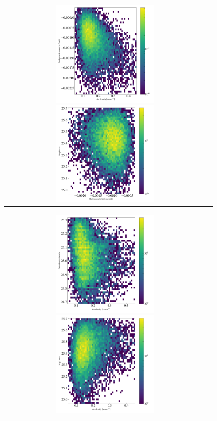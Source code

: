 \documentclass[fleqn,usenatbib,useAMS]{mnras}
\begin{document}
\begin{figure}
\begin{tabular}{cc}
\includegraphics[width=0.5\textwidth]{figures_tmp/sys/correlation1.png}
\includegraphics[width=0.5\textwidth]{figures_tmp/sys/correlation2.png}
\end{tabular}
\begin{tabular}{cc}
\includegraphics[width=0.5\textwidth]{figures_tmp/sys/correlation3.png}
\includegraphics[width=0.5\textwidth]{figures_tmp/sys/correlation5.png}

\end{tabular}
\end{figure}
\end{document}
